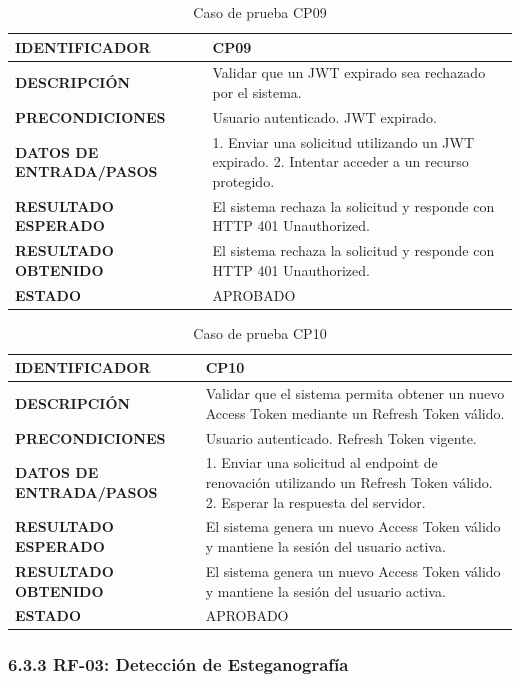 \begin{table}[H]
\centering
\caption{Caso de prueba CP09}
\begin{tabular}{|p{3.5cm}|p{10.3cm}|}
\hline
\textbf{IDENTIFICADOR} & CP09 \\
\hline
\textbf{DESCRIPCIÓN} & Validar que un JWT expirado sea rechazado por el sistema. \\
\hline
\textbf{PRECONDICIONES} & Usuario autenticado. JWT expirado. \\
\hline
\textbf{DATOS DE ENTRADA/PASOS} & 1. Enviar una solicitud utilizando un JWT expirado. 2. Intentar acceder a un recurso protegido. \\
\hline
\textbf{RESULTADO ESPERADO} & El sistema rechaza la solicitud y responde con HTTP 401 Unauthorized. \\
\hline
\textbf{RESULTADO OBTENIDO} & El sistema rechaza la solicitud y responde con HTTP 401 Unauthorized. \\
\hline
\textbf{ESTADO} & APROBADO \\
\hline
\end{tabular}
\end{table}

\begin{table}[H]
\centering
\caption{Caso de prueba CP10}
\begin{tabular}{|p{3.5cm}|p{10.3cm}|}
\hline
\textbf{IDENTIFICADOR} & CP10 \\
\hline
\textbf{DESCRIPCIÓN} & Validar que el sistema permita obtener un nuevo Access Token mediante un Refresh Token válido. \\
\hline
\textbf{PRECONDICIONES} & Usuario autenticado. Refresh Token vigente. \\
\hline
\textbf{DATOS DE ENTRADA/PASOS} & 1. Enviar una solicitud al endpoint de renovación utilizando un Refresh Token válido. 2. Esperar la respuesta del servidor. \\
\hline
\textbf{RESULTADO ESPERADO} & El sistema genera un nuevo Access Token válido y mantiene la sesión del usuario activa. \\
\hline
\textbf{RESULTADO OBTENIDO} & El sistema genera un nuevo Access Token válido y mantiene la sesión del usuario activa. \\
\hline
\textbf{ESTADO} & APROBADO \\
\hline
\end{tabular}
\end{table}

\subsubsection{6.3.3 RF-03: Detección de Esteganografía}

